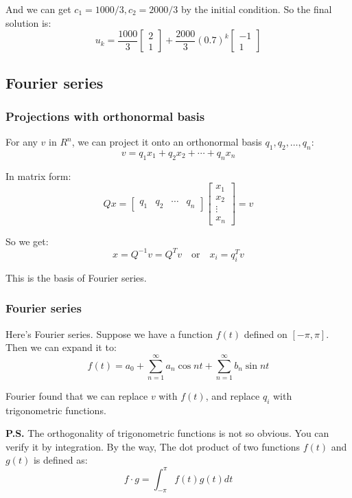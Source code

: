 \documentclass[12pt]{ctexart}
\begin{document}
And we can get $c_1 = 1000/3, c_2 = 2000/3$ by the initial condition. So the final
solution is:
\[
  u_k = \frac{1000}{3} \begin{bmatrix}
    2 \\
    1
  \end{bmatrix} +
  \frac{2000}{3} (0.7)^k \begin{bmatrix}
    -1 \\
    1
  \end{bmatrix}
\]

\subsection{\textbf{Fourier series}}
\subsubsection{\textbf{Projections with orthonormal basis}}

For any $v$ in $R^n$, we can project it onto an orthonormal basis $q_1, q_2, \ldots, q_n$:
\[
  v = q_1x_1 + q_2x_2 + \cdots + q_nx_n
\]

In matrix form:
\[
  Qx = \begin{bmatrix}
    q_1 & q_2 & \cdots & q_n
  \end{bmatrix}
  \begin{bmatrix}
    x_1 \\
    x_2 \\
    \vdots \\
    x_n
  \end{bmatrix} = v
\]

So we get:
\[
  x = Q^{-1}v = Q^{T}v \quad \text{or} \quad x_i = q_i^{T}v
\]

This is the basis of Fourier series.

\subsubsection{\textbf{Fourier series}}

Here's Fourier series. Suppose we have a function $f(t)$ defined on $[-\pi, \pi]$.
Then we can expand it to:
\[
  f(t) = a_0 + \sum_{n=1}^{\infty} a_n \cos nt + \sum_{n=1}^{\infty} b_n \sin nt
\]

Fourier found that we can replace $v$ with $f(t)$, and replace $q_i$ with
trigonometric functions.

\textbf{P.S.} The orthogonality of trigonometric functions is not so obvious. You can
verify it by integration. By the way, The dot product of two functions $f(t)$ and $g(t)$
is defined as:
\[
  f \cdot g = \int_{-\pi}^{\pi} f(t)g(t) dt
\]
\end{document}
